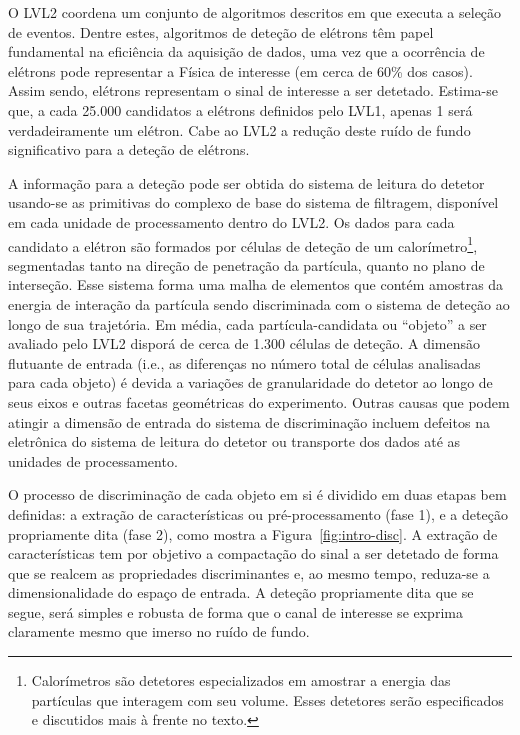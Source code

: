 O LVL2 coordena um conjunto de algoritmos descritos em  que
executa a seleção de eventos. Dentre estes, algoritmos de deteção de elétrons
têm papel fundamental na eficiência da aquisição de dados, uma vez que a
ocorrência de elétrons pode representar a Física de interesse (em cerca de
60\% dos casos). Assim sendo, elétrons representam o sinal de interesse a ser
detetado. Estima-se que, a cada 25.000 candidatos a elétrons definidos pelo
LVL1, apenas 1 será verdadeiramente um elétron. Cabe ao LVL2 a redução deste
ruído de fundo significativo para a deteção de elétrons.

A informação para a deteção pode ser obtida do sistema de leitura do detetor
usando-se as primitivas do complexo  de base do sistema de
filtragem, disponível em cada unidade de processamento dentro do LVL2. Os
dados para cada candidato a elétron são formados por células de deteção de um
calorímetro\footnote{Calorímetros são detetores especializados em amostrar a
energia das partículas que interagem com seu volume. Esses detetores serão
especificados e discutidos mais à frente no texto.}, segmentadas tanto na
direção de penetração da partícula, quanto no plano de interseção. Esse
sistema forma uma malha de elementos que contém amostras da energia de
interação da partícula sendo discriminada com o sistema de deteção ao longo de
sua trajetória. Em média, cada partícula-candidata ou ``objeto'' a ser
avaliado pelo LVL2 disporá de cerca de 1.300 células de deteção. A dimensão
flutuante de entrada (i.e., as diferenças no número total de células
analisadas para cada objeto) é devida a variações de granularidade do detetor
ao longo de seus eixos e outras facetas geométricas do experimento. Outras
causas que podem atingir a dimensão de entrada do sistema de discriminação
incluem defeitos na eletrônica do sistema de leitura do detetor ou transporte
dos dados até as unidades de processamento.

O processo de discriminação de cada objeto em si é dividido em duas etapas bem
definidas: a extração de características ou pré-processamento (fase 1), e a
deteção propriamente dita (fase 2), como mostra a
Figura~\ref{fig:intro-disc}. A extração de características tem por objetivo a
compactação do sinal a ser detetado de forma que se realcem as propriedades
discriminantes e, ao mesmo tempo, reduza-se a dimensionalidade do espaço de
entrada. A deteção propriamente dita que se segue, será simples e robusta de
forma que o canal de interesse se exprima claramente mesmo que imerso no
ruído de fundo.

